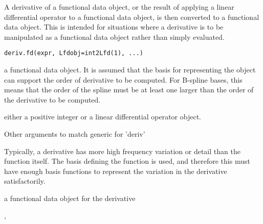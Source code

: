 \documentclass{article}
\begin{document}
\begin{Description}\relax
A derivative of a functional data object, or the result of applying
a linear differential operator to a functional data object, is then
converted to a functional data object. This is intended for situations
where a derivative is to be manipulated as a functional data object
rather than simply evaluated.
\end{Description}
\begin{Usage}
\begin{verbatim}
deriv.fd(expr, Lfdobj=int2Lfd(1), ...)
\end{verbatim}
\end{Usage}
\begin{Arguments}
\begin{ldescription}
\item[\code{expr}] a functional data object.  It is assumed that the basis for
representing the object can support the order of derivative
to be computed.  For B-spline bases, this means that the
order of the spline must be at least one larger than the order of
the derivative to be computed.

\item[\code{Lfdobj}] either a positive integer or a linear differential operator object.

\item[\code{...}] Other arguments to match generic for 'deriv'
\end{ldescription}
\end{Arguments}
\begin{Details}\relax
Typically, a derivative has more high frequency variation or detail
than the function itself.  The basis defining the function is used,
and therefore this must have enough basis functions to represent
the variation in the derivative satisfactorily.
\end{Details}
\begin{Value}
a functional data object for the derivative
\end{Value}
\begin{SeeAlso}\relax
{}, 
\end{SeeAlso}
\end{document}
